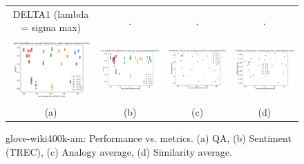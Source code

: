 \begin{figure}
\begin{tabular}{@{\hskip -0.0in}c@{\hskip -0.0in}c@{\hskip -0.0in}c@{\hskip -0.0in}c@{\hskip -0.0in}}
		DELTA1 (lambda = sigma max) & . & . & . \\
		\includegraphics[width=.245\linewidth]{figures/glove-wiki400k-am_qa_best-f1_vs_gram-large-dim-delta1-6-trans_linx.pdf} &
		\includegraphics[width=.245\linewidth]{figures/glove-wiki400k-am_sentiment_trec_test-acc_vs_gram-large-dim-delta1-6-trans_linx.pdf} &
		\includegraphics[width=.245\linewidth]{figures/glove-wiki400k-am_intrinsics_analogy-avg-score_vs_gram-large-dim-delta1-6-trans_linx.pdf} &
		\includegraphics[width=.245\linewidth]{figures/glove-wiki400k-am_intrinsics_similarity-avg-score_vs_gram-large-dim-delta1-6-trans_linx.pdf} \\		
		
		\;\;\;\;\;(a) & \;\;\;\;\;\;(b) & \;\;\;\;\;\;(c) & \;\;\;\;\;\;(d)
	\end{tabular}
	\caption{glove-wiki400k-am: Performance vs. metrics. (a) QA, (b) Sentiment (TREC), (c) Analogy average, (d) Similarity average.
	}
	\label{fig:glove_wiki400k_am_comparison_results}
\end{figure}


